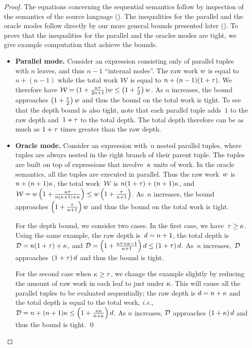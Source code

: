 \begin{proof}
The equations concerning the sequential semantics follow by inspection
of the semantics of the source language ().  The
inequalities for the parallel and the oracle modes follow directly by
our more general bounds presented later
().  To prove that the
inequalities for the parallel and the oracles modes are tight, we give
example computation that achieve the bounds.

\begin{itemize}
\item \textbf{Parallel mode.}  Consider an expression consisting only
  of parallel tuples with $n$ leaves, and thus $n-1$ ``internal
  nodes''.  The raw work $w$ is equal to $n+(n-1)$ while the total
  work ${\mathcal{W}}$ is equal to $n+(n-1)(1+{\tau})$.  We therefore have ${\mathcal{W}}
  = (1+\frac{n{\tau}}{2n+1})w \le \left(1+\frac{\tau}{2}\right)
  w$. As $n$ increases, the bound approaches
  $\left(1+\frac{\tau}{2}\right) w$ and thus the bound on the total
  work is tight. To see that the depth bound is also tight, note that
  each parallel tuple adds~$1$ to the raw depth and~$1+{\tau}$ to the
  total depth.  The total depth therefore can be as much as $1+{\tau}$
  times greater than the raw depth.

\item \textbf{Oracle mode.}  
Consider an expression with~$n$ nested parallel tuples, where tuples
are always nested in the right branch of their parent tuple.  The
tuples are built on top of expressions that involve~${\kappa}$ 
units of work.  In the oracle semantics, all the tuples
are executed in parallel.  Thus the raw work~$w$ is $n +
(n+1){\kappa}$, the total work~${\mathcal{W}}$ is $n (1+{\tau}) +
(n+1){\kappa}$, and ${\mathcal{W}} = w \left( 1 + \frac{n{\tau}}{n({\kappa}+1)+{\kappa}}
\right) \le w \left( 1+\frac{{\tau}}{{\kappa}+1} \right)$.  As~$n$
increases, the bound approaches $\left(1+\frac{{\tau}}{{\kappa} + 1}\right) w$
and thus the bound on the total work is tight.  

For the depth bound, we  consider two cases.  In the first case,
we have~${\tau} \geq {\kappa}$.  Using the same example, the raw depth is~$
d = n+1$, the total depth is~${\mathcal{D}} = n(1+{\tau}) + {\kappa}$, and ${\mathcal{D}} =
\left( 1+\frac{n{\tau}+{\kappa}-1}{n+1} \right) d \le \left( 1+{\tau}
\right) d$.  As~$n$ increases,~${\mathcal{D}}$ approaches~$\left( 1+{\tau}
\right) d$ and thus the bound is tight.

For the second case when ${\kappa}\geq{\tau}$, we change the example
slightly by reducing the amount of raw work in each leaf to just
under ${\kappa}$.  This will cause all the parallel tuples to be
evaluated sequentially; the raw depth is $d = n+{\kappa}$ and the
total depth is equal to the total work, \textit{i.e.}, ${\mathcal{D}} = n+(n+1){\kappa} \le
\left( 1+\frac{n{\kappa}}{n+{\kappa}} \right) d$.  As $n$ increases, ${\mathcal{D}}$
approaches $\left( 1+{\kappa} \right) d$ and thus the
bound is tight. \qed
\end{itemize}
\end{proof}

